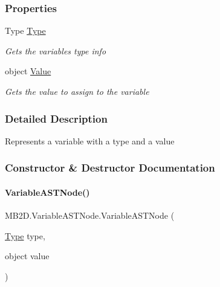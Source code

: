 \subsubsection*{Properties}
\begin{DoxyCompactItemize}
\item 
Type \hyperlink{class_m_b2_d_1_1_variable_a_s_t_node_a32549a5361b7664b945b4d9537a5b454}{Type}
\begin{DoxyCompactList}\small\item\em Gets the variables type info \end{DoxyCompactList}\item 
object \hyperlink{class_m_b2_d_1_1_variable_a_s_t_node_ac96eab1a60b3cfab45a718ff87473a4f}{Value}
\begin{DoxyCompactList}\small\item\em Gets the value to assign to the variable \end{DoxyCompactList}\end{DoxyCompactItemize}


\subsubsection{Detailed Description}
Represents a variable with a type and a value 



\subsubsection{Constructor \& Destructor Documentation}
\hypertarget{class_m_b2_d_1_1_variable_a_s_t_node_a60c81f23a47577aefc76ecb9dc18d40f}{}\label{class_m_b2_d_1_1_variable_a_s_t_node_a60c81f23a47577aefc76ecb9dc18d40f} 
\paragraph{\texorpdfstring{Variable\+A\+S\+T\+Node()}{VariableASTNode()}}
{\footnotesize\ttfamily M\+B2\+D.\+Variable\+A\+S\+T\+Node.\+Variable\+A\+S\+T\+Node (\begin{DoxyParamCaption}\item[{\hyperlink{class_m_b2_d_1_1_variable_a_s_t_node_a32549a5361b7664b945b4d9537a5b454}{Type}}]{type,  }\item[{object}]{value }\end{DoxyParamCaption})\hspace{0.3cm}{\ttfamily [inline]}}



